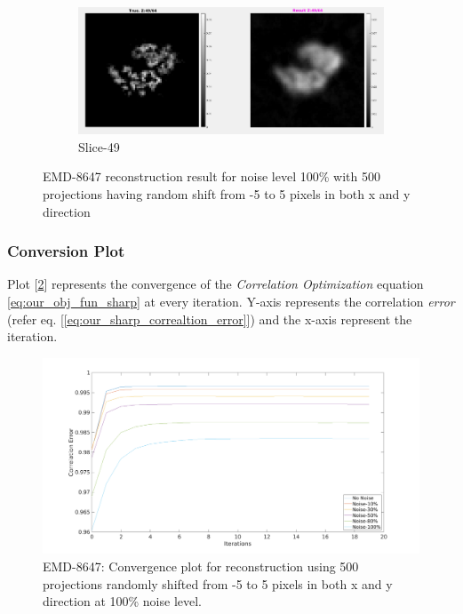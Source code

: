 \documentclass{report}
\begin{document}
\begin{figure}[H]
\begin{subfigure}{1\textwidth}
\centering
\includegraphics[width=1\linewidth]{emd_8647_result_sharp_4.png}
\captionsetup{justification=centering}
\caption{ Slice-49 }
\end{subfigure} 
\caption{EMD-8647 reconstruction result for noise level 100\%  with 500 projections having random shift from -5 to 5 pixels in both x and y direction}
\label{fig:EMD-8647 Reconstruction: Result-noise-100-shift-5}
\end{figure}

\subsubsection{Conversion Plot}

Plot [\ref{figplot:emd_8647_result_shift-Bm3d_convergence}] represents the convergence of the \textit{Correlation Optimization} equation \ref{eq:our_obj_fun_sharp} at every iteration. Y-axis represents the correlation \textit{error} (refer eq. [\ref{eq:our_sharp_correaltion_error}]) and the x-axis represent the iteration.

\begin{figure}[H]
\includegraphics[width=1\textwidth]{emd_8647_result_shift_5_Bm3d_convergence.png}
\centering
\captionsetup{justification=centering}
\caption{EMD-8647: Convergence plot for reconstruction using 500  projections randomly shifted from -5 to 5 pixels in both x and y direction at 100\% noise level. }
\label{figplot:emd_8647_result_shift-Bm3d_convergence}
\end{figure}
\end{document}
